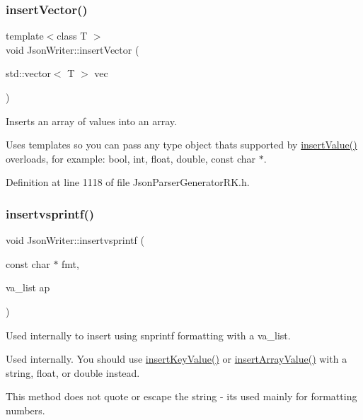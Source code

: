 \subsubsection{\texorpdfstring{insert\+Vector()}{insertVector()}}
{\footnotesize\ttfamily template$<$class T $>$ \\
void Json\+Writer\+::insert\+Vector (\begin{DoxyParamCaption}\item[{std\+::vector$<$ T $>$}]{vec }\end{DoxyParamCaption})\hspace{0.3cm}{\ttfamily [inline]}}



Inserts an array of values into an array. 

Uses templates so you can pass any type object that\textquotesingle{}s supported by \hyperlink{class_json_writer_ac58734c238ba7be066838591b0cc7743}{insert\+Value()} overloads, for example\+: bool, int, float, double, const char $\ast$. 

Definition at line 1118 of file Json\+Parser\+Generator\+R\+K.\+h.

\mbox{\label{class_json_writer_ab737d9527845638e08bd71034d419e49}} 
\subsubsection{\texorpdfstring{insertvsprintf()}{insertvsprintf()}}
{\footnotesize\ttfamily void Json\+Writer\+::insertvsprintf (\begin{DoxyParamCaption}\item[{const char $\ast$}]{fmt,  }\item[{va\+\_\+list}]{ap }\end{DoxyParamCaption})}



Used internally to insert using snprintf formatting with a va\+\_\+list. 

Used internally. You should use \hyperlink{class_json_writer_ac2de627389b59ce2c8ed95e10ea213bf}{insert\+Key\+Value()} or \hyperlink{class_json_writer_a8b4dc6726b66b4f277c7674e60c8a057}{insert\+Array\+Value()} with a string, float, or double instead.

This method does not quote or escape the string -\/ it\textquotesingle{}s used mainly for formatting numbers. 

